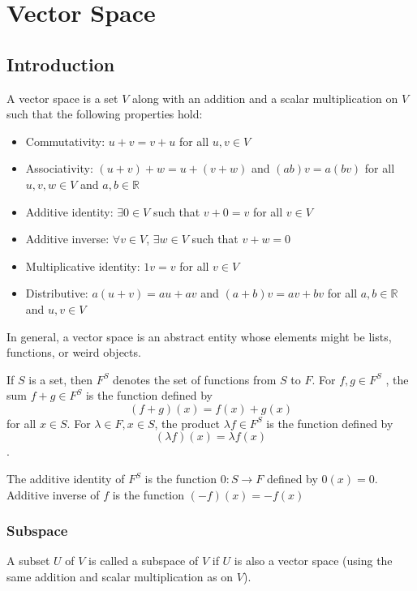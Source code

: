 \chapter{Vector Space}

\section{Introduction}

A vector space is a set $V$ along with an addition and a scalar multiplication on $V$ such that the following properties hold:
\begin{itemize}
  \item Commutativity: $u + v = v + u$  for all $u,v \in V$
  \item Associativity: $(u+v) + w=u+(v+w)$ and $(ab)v=a(bv)$ for all $u,v,w \in V$ and $a, b \in \mathbb{R}$
  \item Additive identity: $\exists 0 \in V$ such that $v+0 = v$ for all $v \in V$
  \item Additive inverse: $\forall v \in V$, $\exists w \in V$ such that $v + w = 0$
  \item Multiplicative identity: $1v = v$ for all $v \in V$
  \item Distributive: $a(u+v)=au+ av$ and $(a+b)v=av+bv$ for all $a,b \in \mathbb{R}$ and $u,v \in V$
\end{itemize}

In general, a vector space is an abstract entity whose elements might be lists, functions, or weird objects.

\begin{example}
  If $S$ is a set, then $F^S$ denotes the set of functions from $S$ to $F$.
  For $f,g \in F^S$ , the sum $f + g \in F^S$ is the function defined by
  \[
    (f+g)(x) = f(x) + g(x)
  \]
  for all $x \in S$. For $\lambda \in F, x\in S$, the product $\lambda f \in F^S$ is the function defined by
  \[
    (\lambda f)(x) = \lambda f(x)
  \].

  The additive identity of $F^S$ is the function $0 : S \to F$ defined by $0(x) = 0$. Additive inverse of $f$ is the function $(-f)(x)=-f(x)$
\end{example}

\subsection{Subspace}
A subset $U$ of $V$ is called a subspace of $V$ if $U$ is also a vector space (using the same addition and scalar multiplication as on $V$).

